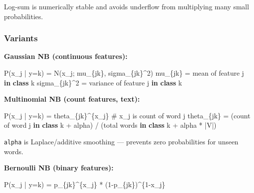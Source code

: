 \documentclass[11pt]{article}
\newenvironment{Shaded}{\begin{snugshade}}{\end{snugshade}}
\newcommand{\CommentTok}[1]{\textcolor[rgb]{0.48,0.49,0.49}{#1}}
\newcommand{\DecValTok}[1]{\textcolor[rgb]{0.96,0.45,0.00}{#1}}
\newcommand{\KeywordTok}[1]{\textcolor[rgb]{0.81,0.81,0.76}{\textbf{#1}}}
\newcommand{\NormalTok}[1]{\textcolor[rgb]{0.81,0.81,0.76}{#1}}
\newcommand{\OperatorTok}[1]{\textcolor[rgb]{0.81,0.81,0.76}{#1}}
\begin{document}
Log-sum is numerically stable and avoids underflow from multiplying many small probabilities.

\subsubsection{Variants}\label{variants}

\textbf{Gaussian NB (continuous features):}


\begin{Shaded}
\begin{Highlighting}[]
\NormalTok{P(x\_j }\OperatorTok{|}\NormalTok{ y}\OperatorTok{=}\NormalTok{k) }\OperatorTok{=}\NormalTok{ N(x\_j}\OperatorTok{;}\NormalTok{ mu\_\{jk\}, sigma\_\{jk\}}\OperatorTok{\^{}}\DecValTok{2}\NormalTok{)}
\NormalTok{mu\_\{jk\} }\OperatorTok{=}\NormalTok{ mean of feature j }\KeywordTok{in} \KeywordTok{class}\NormalTok{ k}
\NormalTok{sigma\_\{jk\}}\OperatorTok{\^{}}\DecValTok{2} \OperatorTok{=}\NormalTok{ variance of feature j }\KeywordTok{in} \KeywordTok{class}\NormalTok{ k}
\end{Highlighting}
\end{Shaded}

\textbf{Multinomial NB (count features, text):}


\begin{Shaded}
\begin{Highlighting}[]
\NormalTok{P(x\_j }\OperatorTok{|}\NormalTok{ y}\OperatorTok{=}\NormalTok{k) }\OperatorTok{=}\NormalTok{ theta\_\{jk\}}\OperatorTok{\^{}}\NormalTok{\{x\_j\}      }\CommentTok{\# x\_j is count of word j}
\NormalTok{theta\_\{jk\} }\OperatorTok{=}\NormalTok{ (count of word j }\KeywordTok{in} \KeywordTok{class}\NormalTok{ k }\OperatorTok{+}\NormalTok{ alpha) }\OperatorTok{/}\NormalTok{ (total words }\KeywordTok{in} \KeywordTok{class}\NormalTok{ k }\OperatorTok{+}\NormalTok{ alpha }\OperatorTok{*} \OperatorTok{|}\NormalTok{V}\OperatorTok{|}\NormalTok{)}
\end{Highlighting}
\end{Shaded}

\texttt{alpha} is Laplace/additive smoothing --- prevents zero probabilities for unseen words.

\textbf{Bernoulli NB (binary features):}


\begin{Shaded}
\begin{Highlighting}[]
\NormalTok{P(x\_j }\OperatorTok{|}\NormalTok{ y}\OperatorTok{=}\NormalTok{k) }\OperatorTok{=}\NormalTok{ p\_\{jk\}}\OperatorTok{\^{}}\NormalTok{\{x\_j\} }\OperatorTok{*}\NormalTok{ (}\DecValTok{1}\OperatorTok{{-}}\NormalTok{p\_\{jk\})}\OperatorTok{\^{}}\NormalTok{\{}\DecValTok{1}\OperatorTok{{-}}\NormalTok{x\_j\}}
\end{Highlighting}
\end{Shaded}
\end{document}
